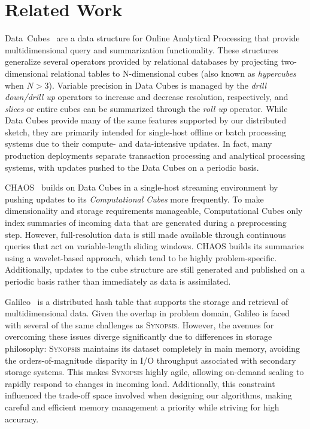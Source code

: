 \section{Related Work}
\label{sec:related}
Data~Cubes~\cite{gray1996data,harinarayan1996implementing,mumick1997maintenance,ho1997range} are a data structure for Online Analytical Processing that provide multidimensional query and summarization functionality. These structures generalize several operators provided by relational databases by projecting two-dimensional relational tables to N-dimensional cubes (also known as \emph{hypercubes} when $N > 3$). Variable precision in Data Cubes is managed by the \emph{drill down/drill up} operators to increase and decrease resolution, respectively, and \emph{slices} or entire cubes can be summarized through the \emph{roll up} operator. While Data Cubes provide many of the same features supported by our distributed sketch, they are primarily intended for single-host offline or batch processing systems due to their compute- and data-intensive updates. In fact, many production deployments separate transaction processing and analytical processing systems, with updates pushed to the Data Cubes on a periodic basis. 

CHAOS~\cite{gupta2009chaos} builds on Data Cubes in a single-host streaming environment by pushing updates to its \emph{Computational Cubes} more frequently. To make dimensionality and storage requirements manageable, Computational Cubes only index summaries of incoming data that are generated during a preprocessing step. However, full-resolution data is still made available through continuous queries that act on variable-length sliding windows. CHAOS builds its summaries using a wavelet-based approach, which tend to be highly problem-specific. Additionally, updates to the cube structure are still generated and published on a periodic basis rather than immediately as data is assimilated.

Galileo~\cite{malensek2016analytic,malensek2015fast} is a distributed hash table that supports the storage and retrieval of multidimensional data. Given the overlap in problem domain, Galileo is faced with several of the same challenges as \textsc{Synopsis}. However, the avenues for overcoming these issues diverge significantly due to differences in storage philosophy: \textsc{Synopsis} maintains its dataset completely in main memory, avoiding the orders-of-magnitude disparity in I/O throughput associated with secondary storage systems. This makes \textsc{Synopsis} highly agile, allowing on-demand scaling to rapidly respond to changes in incoming load. Additionally, this constraint influenced the trade-off space involved when designing our algorithms, making careful and efficient memory management a priority while striving for high accuracy.

